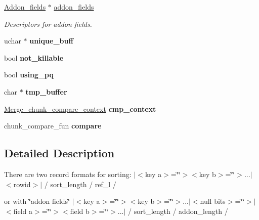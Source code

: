 \begin{DoxyCompactItemize}
\item 
\mbox{\label{classSort__param_a4af9855ed31b8f380e4d1f3ec731db11}} 
\mbox{\hyperlink{classAddon__fields}{Addon\+\_\+fields}} $\ast$ \mbox{\hyperlink{classSort__param_a4af9855ed31b8f380e4d1f3ec731db11}{addon\+\_\+fields}}
\begin{DoxyCompactList}\small\item\em Descriptors for addon fields. \end{DoxyCompactList}\item 
\mbox{\label{classSort__param_a514d144dde0cb20030d4c64c331248af}} 
uchar $\ast$ {\bfseries unique\+\_\+buff}
\item 
\mbox{\label{classSort__param_aaa35c2329e1c5f2509041eb55e56695e}} 
bool {\bfseries not\+\_\+killable}
\item 
\mbox{\label{classSort__param_abf5824ce6a8ebdc00cbe7122505af858}} 
bool {\bfseries using\+\_\+pq}
\item 
\mbox{\label{classSort__param_a34f5100274496fe458a7dddd3400d545}} 
char $\ast$ {\bfseries tmp\+\_\+buffer}
\item 
\mbox{\label{classSort__param_af652a78b1db6619360c3d2960e7e9313}} 
\mbox{\hyperlink{structMerge__chunk__compare__context}{Merge\+\_\+chunk\+\_\+compare\+\_\+context}} {\bfseries cmp\+\_\+context}
\item 
\mbox{\label{classSort__param_ab9b0af6716a1a6fbc532d867e1fe436b}} 
chunk\+\_\+compare\+\_\+fun {\bfseries compare}
\end{DoxyCompactItemize}


\subsection{Detailed Description}
There are two record formats for sorting\+: $\vert$$<$key a$>$=\char`\"{}\char`\"{}$>$$<$key b$>$=\char`\"{}\char`\"{}$>$...$\vert$$<$rowid$>$$\vert$ / sort\+\_\+length / ref\+\_\+l /

or with \char`\"{}addon fields\char`\"{} $\vert$$<$key a$>$=\char`\"{}\char`\"{}$>$$<$key b$>$=\char`\"{}\char`\"{}$>$...$\vert$$<$null bits$>$=\char`\"{}\char`\"{}$>$$\vert$$<$field a$>$=\char`\"{}\char`\"{}$>$$<$field b$>$=\char`\"{}\char`\"{}$>$...$\vert$ / sort\+\_\+length / addon\+\_\+length /

